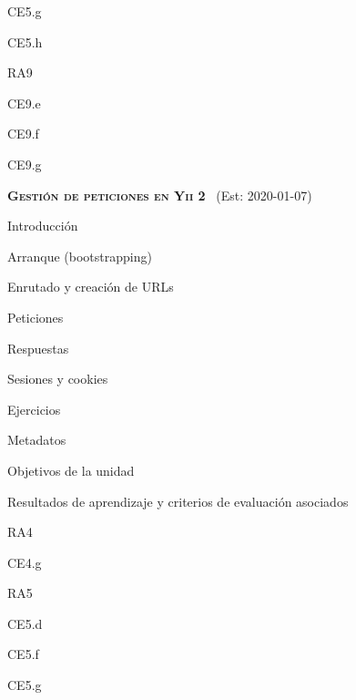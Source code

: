 \begin{longenum}
\begin{longenum}
\begin{longenum}
\begin{longenum}
                \begin{longenum}
                    \item CE5.g
                    \item CE5.h
                \end{longenum}
                \item RA9
                \begin{longenum}
                    \item CE9.e
                    \item CE9.f
                    \item CE9.g
                \end{longenum}
            \end{longenum}
        \end{longenum}
    \end{longenum}
    \item \textbf{\textsc{Gestión de peticiones en Yii 2}} \ (Est: 2020-01-07)
    \begin{longenum}
        \item Introducción
        \item Arranque (bootstrapping)
        \item Enrutado y creación de URLs
        \item Peticiones
        \item Respuestas
        \item Sesiones y cookies
        \item Ejercicios
        \item Metadatos
        \begin{longenum}
            \item Objetivos de la unidad
            \item Resultados de aprendizaje y criterios de evaluación asociados
            \begin{longenum}
                \item RA4
                \begin{longenum}
                    \item CE4.g
                \end{longenum}
                \item RA5
                \begin{longenum}
                    \item CE5.d
                    \item CE5.f
                    \item CE5.g

\end{longenum}
\end{longenum}
\end{longenum}
\end{longenum}
\end{longenum}
